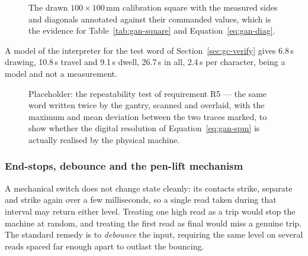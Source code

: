 \begin{figure}[htb]
\centering
{}
\caption{The drawn $100\times100$\,mm calibration square with the measured sides and diagonals annotated against their commanded values, which is the evidence for Table~\ref{tab:gan-square} and Equation~\ref{eq:gan-diag}.}
\label{fig:gan-square}
\end{figure}


A model of the interpreter for the test word of Section~\ref{sec:gc-verify} gives 6.8\,s drawing, 10.8\,s travel and 9.1\,s dwell, 26.7\,s in all, 2.4\,s per character, being a model and not a measurement.

\begin{figure}[htb]
\centering
{}
\captionsetup{singlelinecheck=false,justification=justified}
\caption{Placeholder: the repeatability test of requirement R5 --- the same word written twice by the gantry, scanned and overlaid, with the maximum and mean deviation between the two traces marked, to show whether the digital resolution of Equation~\ref{eq:gan-spm} is actually realised by the physical machine.}
\label{fig:gan-repeat}
\end{figure}

\subsubsection{End-stops, debounce and the pen-lift mechanism}
\label{sec:gan-stop}
\label{sec:gan-pen}

A mechanical switch does not change state cleanly: its contacts strike, separate and strike again over a few milliseconds, so a single read taken during that interval may return either level. Treating one high read as a trip would stop the machine at random, and treating the first read as final would miss a genuine trip. The standard remedy is to \emph{debounce} the input, requiring the same level on several reads spaced far enough apart to outlast the bouncing.

